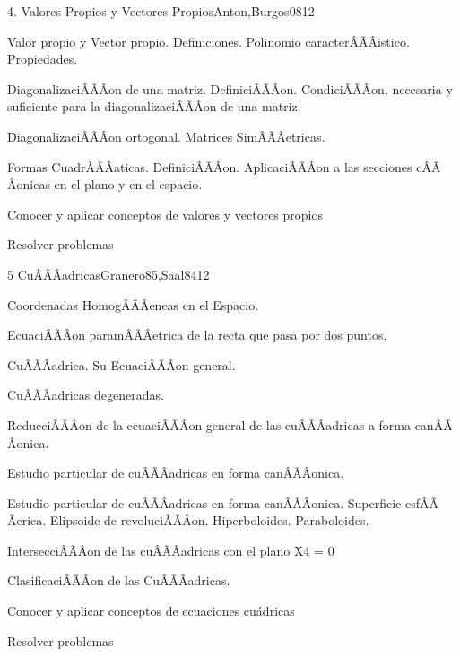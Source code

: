 \begin{sumilla}
\begin{unit}{4. Valores Propios y Vectores Propios}{Anton,Burgos08}{12}
\begin{topicos}
      \item Valor propio y Vector propio. Definiciones. Polinomio caracter\ÃÂÃÂistico. Propiedades.
      \item Diagonalizaci\ÃÂÃÂon de una matriz. Definici\ÃÂÃÂon. Condici\ÃÂÃÂon, necesaria y suficiente para la diagonalizaci\ÃÂÃÂon de una matriz.
      \item Diagonalizaci\ÃÂÃÂon ortogonal. Matrices Sim\ÃÂÃÂetricas.
	\item Formas Cuadr\ÃÂÃÂaticas. Definici\ÃÂÃÂon. Aplicaci\ÃÂÃÂon a las secciones c\ÃÂÃÂonicas en el plano y en el espacio.
	\end{topicos}

   \begin{objetivos}
      \item Conocer y aplicar conceptos de valores y vectores propios
	\item Resolver problemas
   \end{objetivos}
\end{unit}

\begin{unit}{5 Cu\ÃÂÃÂadricas}{Granero85,Saal84}{12}
\begin{topicos}
      \item Coordenadas Homog\ÃÂÃÂeneas en el Espacio.
	\item Ecuaci\ÃÂÃÂon param\ÃÂÃÂetrica de la recta que pasa por dos puntos.
	\item Cu\ÃÂÃÂadrica. Su Ecuaci\ÃÂÃÂon general.
	\item Cu\ÃÂÃÂadricas degeneradas.
	\item Reducci\ÃÂÃÂon de la ecuaci\ÃÂÃÂon general de las cu\ÃÂÃÂadricas a forma can\ÃÂÃÂonica.
	\item Estudio particular de cu\ÃÂÃÂadricas en forma can\ÃÂÃÂonica.
	\item Estudio particular de cu\ÃÂÃÂadricas en forma can\ÃÂÃÂonica. Superficie esf\ÃÂÃÂerica. Elipsoide de revoluci\ÃÂÃÂon. Hiperboloides. Paraboloides.
	\item Intersecci\ÃÂÃÂon de las cu\ÃÂÃÂadricas con el plano X4 = 0
	\item Clasificaci\ÃÂÃÂon de las Cu\ÃÂÃÂadricas.
   \end{topicos}

   \begin{objetivos}
      \item Conocer y aplicar conceptos de ecuaciones cu\'adricas
	\item Resolver problemas
   \end{objetivos}
\end{unit}

\begin{bibliografia}
\end{bibliografia}
\end{sumilla}


